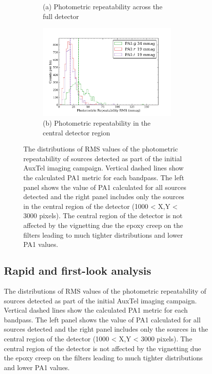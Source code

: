 \begin{figure}[!ht]
\begin{figure}[!ht]
\begin{subfigure}{.5\textwidth}
     \caption[\small]{(a) Photometric repeatability across the full detector}
\end{subfigure}%
\begin{subfigure}{.5\textwidth} 
    \centering
    \includegraphics[width=1.1\textwidth]{figures/pa1_auxtel_central}
    \caption[\small]{(b) Photometric repeatability in the central detector region}
\end{subfigure}
\par\medskip %
\caption[short]{The distributions of RMS values of the photometric repeatability of sources detected as part of the initial AuxTel imaging campaign. Vertical dashed lines show the calculated PA1 metric for each bandpass. The left panel shows the value of PA1 calculated for all sources detected and the right panel includes only the sources in the central region of the detector (1000 < X,Y < 3000 pixels). The central region of the detector is not affected by the vignetting due the epoxy creep on the filters leading to much tighter distributions and lower PA1 values.}
\label{fig:faro_auxtel_metrics}
\end{figure}

\subsection{Rapid and first-look analysis} \label{ssec:rapid}


\end{figure}
